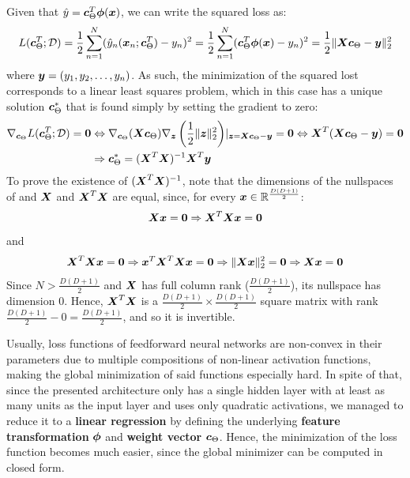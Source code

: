 \begin{questions}
        \question
        Given that $\hat{y} = \vb*{c}^T_{\Theta} \vb*{\phi}(\vb*{x})$, we can write the squared loss as:
        \[
            L(\vb*{c}^T_{\Theta}; \mathcal{D}) = \frac{1}{2} \sum_{n = 1}^{N} (\hat{y}_n(\vb*{x}_n; \vb*{c}^T_{\Theta}) - y_n) ^2 = \frac{1}{2} \sum_{n = 1}^{N} (\vb*{c}^T_{\Theta} \vb*{\phi}(\vb*{x}) - y_n) ^2 = \frac{1}{2} \|\vb*{X}\vb*{c}_{\Theta} - \vb*{y} \|_2^2
        \]
        where $\vb*{y} = (y_1, y_2, \dots, y_n)$. As such, the minimization of the squared lost corresponds to a linear least squares problem, which in this case has a unique solution $\vb*{c}^*_{\Theta}$ that is found simply by setting the gradient to zero:
        \begin{align*}
            \nabla_{\vb*{c}_{\Theta}} L(\vb*{c}^T_{\Theta}; \mathcal{D}) = \vb*{0} &\Leftrightarrow \nabla_{\vb*{c}_{\Theta}}(\vb*{X}\vb*{c}_{\Theta}) \nabla_{\vb*{z}}\left(\frac{1}{2}\|\vb*{z}\|_2^2\right) \rvert_{\vb*{z} = \vb*{X}\vb*{c}_{\Theta} - \vb*{y}} = \vb*{0} \Leftrightarrow \vb*{X}^T(\vb*{X}\vb*{c}_{\Theta} - \vb*{y}) = \vb*{0} \\
            &\Rightarrow \vb*{c}^*_{\Theta} = (\vb*{X}^T\vb*{X})^{-1}\vb*{X}^T\vb*{y}
        \end{align*}
        To prove the existence of $ (\vb*{X}^T\vb*{X})^{-1}$, note that the dimensions of the nullspaces of and $\vb*{X}$ and $\vb*{X}^T\vb*{X}$ are equal, since, for every $\vb*{x} \in \mathbb{R}^{\frac{D(D + 1)}{2}}$:
        \[
            \vb*{X}\vb*{x} = \vb*{0} \Rightarrow \vb*{X}^T\vb*{X}\vb*{x} = \vb*{0}
        \]
        and 
        \[
            \vb*{X}^T\vb*{X}\vb*{x} = \vb*{0} \Rightarrow \vb*{x}^T\vb*{X}^T\vb*{X}\vb*{x} = \vb*{0} 
            \Rightarrow \|\vb*{X}\vb*{x}\|_2^2 = \vb*{0} \Rightarrow \vb*{X}\vb*{x} = \vb*{0}
        \]
        Since $N > \frac{D(D + 1)}{2}$ and $\vb*{X}$ has full column rank ($\frac{D(D + 1)}{2}$), its nullspace has dimension $0$. Hence, $\vb*{X}^T\vb*{X}$ is a $\frac{D(D + 1)}{2} \times \frac{D(D + 1)}{2}$ square matrix with rank $\frac{D(D + 1)}{2} - 0 = \frac{D(D + 1)}{2}$, and so it is invertible. \par
        Usually, loss functions of feedforward neural networks are non-convex in their parameters due to multiple compositions of non-linear activation functions, making the global minimization of said functions especially hard. In spite of that, since the presented architecture only has a single hidden layer with at least as many units as the input layer and uses only quadratic activations, we managed to reduce it to a \textbf{linear regression} by defining the underlying \textbf{feature transformation} $\vb*{\phi}$ and \textbf{weight vector} $\vb*{c}_{\Theta}$. Hence, the minimization of the loss function becomes much easier, since the global minimizer can be computed in closed form.
    \end{questions}
